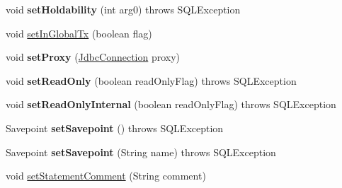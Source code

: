 \begin{DoxyCompactItemize}
void {\bfseries set\+Holdability} (int arg0)  throws S\+Q\+L\+Exception 
\item 
void \mbox{\hyperlink{classcom_1_1mysql_1_1cj_1_1jdbc_1_1ha_1_1_multi_host_my_s_q_l_connection_a317920d3dc1f80c789676ad3391135bc}{set\+In\+Global\+Tx}} (boolean flag)
\item 
\mbox{\label{classcom_1_1mysql_1_1cj_1_1jdbc_1_1ha_1_1_multi_host_my_s_q_l_connection_a623bbf5d735cd8f161ad529702e30895}} 
void {\bfseries set\+Proxy} (\mbox{\hyperlink{interfacecom_1_1mysql_1_1cj_1_1jdbc_1_1_jdbc_connection}{Jdbc\+Connection}} proxy)
\item 
\mbox{\label{classcom_1_1mysql_1_1cj_1_1jdbc_1_1ha_1_1_multi_host_my_s_q_l_connection_a6b44291fee3ab9231f0b69193d052125}} 
void {\bfseries set\+Read\+Only} (boolean read\+Only\+Flag)  throws S\+Q\+L\+Exception 
\item 
\mbox{\label{classcom_1_1mysql_1_1cj_1_1jdbc_1_1ha_1_1_multi_host_my_s_q_l_connection_a7fb4a2245de12b8d29adf4e213d99ed5}} 
void {\bfseries set\+Read\+Only\+Internal} (boolean read\+Only\+Flag)  throws S\+Q\+L\+Exception 
\item 
\mbox{\label{classcom_1_1mysql_1_1cj_1_1jdbc_1_1ha_1_1_multi_host_my_s_q_l_connection_a935d7c4ab643db931af943be82c2a5f9}} 
Savepoint {\bfseries set\+Savepoint} ()  throws S\+Q\+L\+Exception 
\item 
\mbox{\label{classcom_1_1mysql_1_1cj_1_1jdbc_1_1ha_1_1_multi_host_my_s_q_l_connection_ac2ba286456f46addcd0d6d77dbba3b87}} 
Savepoint {\bfseries set\+Savepoint} (String name)  throws S\+Q\+L\+Exception 
\item 
void \mbox{\hyperlink{classcom_1_1mysql_1_1cj_1_1jdbc_1_1ha_1_1_multi_host_my_s_q_l_connection_a4e028eb0c700613a20c0a2b7f8a21170}{set\+Statement\+Comment}} (String comment)
\item 
\mbox{\label{classcom_1_1mysql_1_1cj_1_1jdbc_1_1ha_1_1_multi_host_my_s_q_l_connection_a964a955b8f15fd5214fd1819d3d5f221}} 

\end{DoxyCompactItemize}
